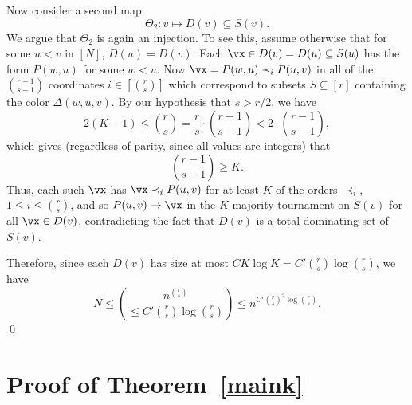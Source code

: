     
    Now consider a second map
    \begin{equation*}
        \Theta_2: v \longmapsto D(v) \subseteq S(v).
    \end{equation*}
    We argue that $\Theta_2$ is again an injection.
    To see this, assume otherwise that for some $u < v$ in $[N]$, $D(u) = D(v)$.
    Each $\vx \in D(v) = D(u) \subseteq S(u)$ has the form $P(w,u)$ for some $w < u$.
    Now $\vx = P(w,u) \prec_i P(u,v)$ in all of the $\binom{r-1}{s-1}$ coordinates $i \in [\binom{r}{s}]$ which correspond to subsets $S \subseteq [r]$ containing the color $\Delta(w,u,v)$.
    By our hypothesis that $s > r/2$, we have
    \begin{equation*}
        2(K-1) \leq \binom{r}{s} = \frac{r}{s} \cdot \binom{r-1}{s-1} < 2 \cdot \binom{r-1}{s-1},
    \end{equation*}
    which gives (regardless of parity, since all values are integers) that 
    \begin{equation*}
        \binom{r-1}{s-1} \geq K.
    \end{equation*}
    Thus, each such $\vx$ has $\vx \prec_i P(u,v)$ for at least $K$ of the orders $\prec_i$, $1 \leq i \leq \binom{r}{s}$, and so $P(u,v) \to \vx$ in the $K$-majority tournament on $S(v)$ for all $\vx \in D(v)$, contradicting the fact that $D(v)$ is a total dominating set of $S(v)$.

    Therefore, since each $D(v)$ has size at most $C K \log K = C' \binom{r}{s} \log \binom{r}{s}$, we have
    \begin{equation*}
        N \leq \binom{n^{\binom{r}{s}}}{\le C' \binom{r}{s} \log \binom{r}{s}} \leq n^{C' \binom{r}{s}^2 \log \binom{r}{s}}.
    \end{equation*}
    \qed

\vspace{-10mm}

\section{Proof of Theorem~\ref{maink}}\label{sk}

